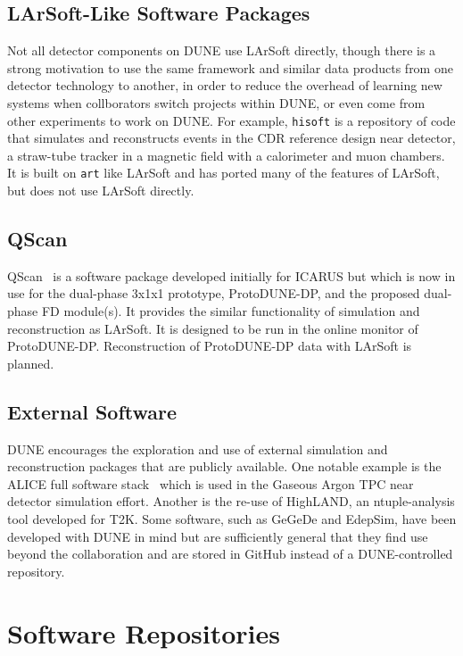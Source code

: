 \subsection{LArSoft-Like Software Packages}

Not all detector components on DUNE use LArSoft directly, though there is a strong motivation to use the
same framework and similar data products from one detector technology to another, in order to reduce the
overhead of learning new systems when collborators switch projects within DUNE, or even come from other
experiments to work on DUNE.  For example, {\tt hisoft} is a repository of code that simulates and reconstructs
events in the CDR reference design near detector, a straw-tube tracker in a magnetic field with a calorimeter
and muon chambers.  It is built on {\tt art} like LArSoft and has ported many of the features of LArSoft, but
does not use LArSoft directly.

\subsection{QScan}

QScan~\cite{QScan}  is a software package developed initially for ICARUS but which is now in use for the
dual-phase 3x1x1 prototype, ProtoDUNE-DP, and the proposed dual-phase FD module(s).  It provides the similar
functionality of simulation and reconstruction as LArSoft.  It is designed to be run in the online monitor
of ProtoDUNE-DP.  Reconstruction of ProtoDUNE-DP data with LArSoft is planned.

\subsection{External Software}

DUNE encourages the exploration and use of external simulation and reconstruction packages that are
publicly available.  One notable example is the ALICE full software stack~\cite{ALICEsw} which is used in the Gaseous
Argon TPC near detector simulation effort.  Another is the re-use of HighLAND, an ntuple-analysis tool
developed for T2K.  Some software, such as GeGeDe and EdepSim, have been developed with DUNE in mind
but are sufficiently general that they find use beyond the collaboration and are stored in GitHub instead
of a DUNE-controlled repository.

\section{Software Repositories}

